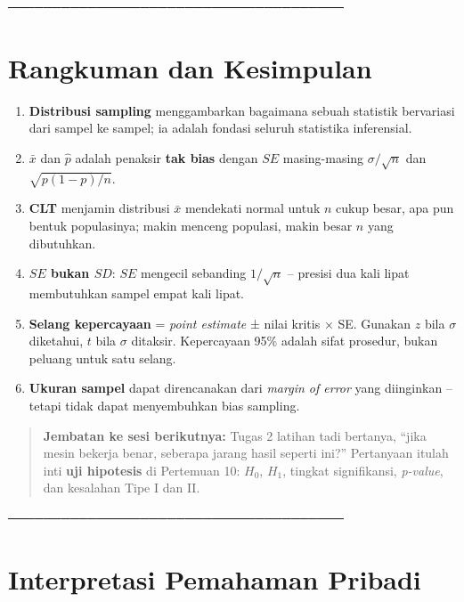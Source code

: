 \documentclass[
  indonesian,
  letterpaper,
]{book}
\begin{document}
──────────────────────────────────────

\section{Rangkuman dan Kesimpulan}\label{rangkuman-dan-kesimpulan}

\begin{enumerate}
\def\labelenumi{\arabic{enumi}.}
\item
  \textbf{Distribusi sampling} menggambarkan bagaimana sebuah statistik
  bervariasi dari sampel ke sampel; ia adalah fondasi seluruh statistika
  inferensial.
\item
  \(\bar{x}\) dan \(\hat{p}\) adalah penaksir \textbf{tak bias} dengan
  \(SE\) masing-masing \(\sigma/\sqrt{n}\) dan \(\sqrt{p(1-p)/n}\).
\item
  \textbf{CLT} menjamin distribusi \(\bar{x}\) mendekati normal untuk
  \(n\) cukup besar, apa pun bentuk populasinya; makin menceng populasi,
  makin besar \(n\) yang dibutuhkan.
\item
  \textbf{\(SE\) bukan \(SD\)}: \(SE\) mengecil sebanding \(1/\sqrt{n}\)
  -- presisi dua kali lipat membutuhkan sampel empat kali lipat.
\item
  \textbf{Selang kepercayaan} = \emph{point estimate} ± nilai kritis ×
  SE. Gunakan \(z\) bila \(\sigma\) diketahui, \(t\) bila \(\sigma\)
  ditaksir. Kepercayaan 95\% adalah sifat prosedur, bukan peluang untuk
  satu selang.
\item
  \textbf{Ukuran sampel} dapat direncanakan dari \emph{margin of error}
  yang diinginkan -- tetapi tidak dapat menyembuhkan bias sampling.
\end{enumerate}

\begin{quote}
\textbf{Jembatan ke sesi berikutnya:} Tugas 2 latihan tadi bertanya,
``jika mesin bekerja benar, seberapa jarang hasil seperti ini?''
Pertanyaan itulah inti \textbf{uji hipotesis} di Pertemuan 10: \(H_0\),
\(H_1\), tingkat signifikansi, \emph{p-value}, dan kesalahan Tipe I dan
II.
\end{quote}

──────────────────────────────────────

\section{Interpretasi Pemahaman
Pribadi}\label{interpretasi-pemahaman-pribadi}
\end{document}
